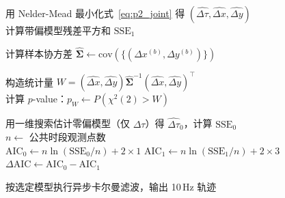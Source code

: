 \begin{algorithm}[htbp]
\caption{系统偏差存在性检验与融合算法（问题三）}
\label{alg:p3_test}

用 Nelder-Mead 最小化式~\eqref{eq:p2_joint} 得 $(\hat{\Delta\tau}, \hat{\Delta x}, \hat{\Delta y})$ \\
计算带偏模型残差平方和 $\text{SSE}_1$

计算样本协方差 $\hat{\boldsymbol{\Sigma}} \leftarrow \text{cov}(\{(\Delta x^{(b)}, \Delta y^{(b)})\})$

构造统计量 $W = (\hat{\Delta x}, \hat{\Delta y}) \hat{\boldsymbol{\Sigma}}^{-1} (\hat{\Delta x}, \hat{\Delta y})^\top$ \\
计算 $p$-value：$p_W \leftarrow P(\chi^2(2) > W)$ 

用一维搜索估计零偏模型（仅 $\Delta\tau$）得 $\hat{\Delta\tau}_0$，计算 $\text{SSE}_0$ \\
$n \leftarrow$ 公共时段观测点数 \\
$\text{AIC}_0 \leftarrow n \ln(\text{SSE}_0/n) + 2 \times 1$ 
$\text{AIC}_1 \leftarrow n \ln(\text{SSE}_1/n) + 2 \times 3$ 
$\Delta\text{AIC} \leftarrow \text{AIC}_0 - \text{AIC}_1$


按选定模型执行异步卡尔曼滤波，输出 10\,Hz 轨迹
\end{algorithm}

